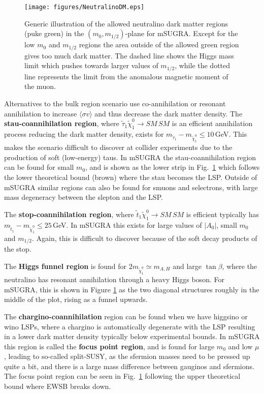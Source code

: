 \documentclass[notes.tex]{subfiles}
\begin{document}
\begin{figure}[h!]
\begin{center}
\texttt{[image: figures/NeutralinoDM.eps]} 
\caption{Generic illustration of the allowed neutralino dark matter regions (puke green) in the $(m_0,m_{1/2})$-plane for mSUGRA. Except for the low $m_0$ and $m_{1/2}$ regions the area outside of the allowed green region gives too much dark matter. The dashed line shows the Higgs mass limit which pushes towards larger values of $m_{1/2}$, while the dotted line represents the limit from the anomalous magnetic moment of the muon.\label{NeuDM}}
\end{center}
\end{figure}

Alternatives to the bulk region scenario use co-annihilation or resonant annihilation to increase $\langle \sigma v \rangle$ and thus decrease the dark matter density. The {\bf stau-coannihilation region}, where $\tilde{\tau}_1 \tilde{\chi}^0_1 \to SM\, SM$ is an efficient annihilation process reducing the dark matter density, exists for $m_{\tilde{\tau}_1} - m_{\tilde{\chi}^0_1}\leq 10$\,GeV. This makes the scenario difficult to discover at collider experiments due to the production of soft (low-energy) taus. In mSUGRA the stau-coannihilation region can be found for small $m_0$, and is shown as the lower strip in Fig.~\ref{NeuDM} which follows the lower theoretical bound (brown) where the stau becomes the LSP. Outside of mSUGRA similar regions can also be found for smuons and selectrons, with large  mass degeneracy between the slepton and the LSP.

The {\bf stop-coannihilation region}, where $\tilde{t}_1 \tilde{\chi}^0_1 \to SM\, SM$ is efficient typically has $m_{\tilde{t}_1} - m_{\tilde{\chi}^0_1}\leq 25$\,GeV. In mSUGRA this exists for large values of $|A_0|$, small $m_0$ and $m_{1/2}$. Again, this is difficult to discover because of the soft decay products of the stop.

The {\bf Higgs funnel region} is found for $2 m_{\tilde{\chi}^0_1} \simeq m_{A,H}$ and large $\tan \beta$, where the neutralino has resonant annihilation through a heavy Higgs boson. For mSUGRA, this is shown in Figure \ref{NeuDM} as the two diagonal structures roughly in the middle of the plot, rising as a funnel upwards.

The {\bf chargino-coannihilation} region can be found when we have higgsino or wino LSPs, where a chargino is automatically degenerate with the LSP resulting in a lower dark matter density typically below experimental bounds. In mSUGRA this region is called the  {\bf focus point region}, and is found for large $m_0$ and low $\mu$, leading to so-called split-SUSY, as the sfermion masses need to be pressed up quite a bit, and there is a large mass difference between gauginos and sfermions. The focus point region can be seen in Fig.~\ref{NeuDM} following the upper theoretical bound where EWSB breaks down.
\end{document}
